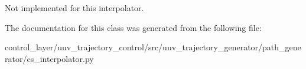 \begin{DoxyVerb}Not implemented for this interpolator.\end{DoxyVerb}
 

The documentation for this class was generated from the following file\+:\begin{DoxyCompactItemize}
\item 
control\+\_\+layer/uuv\+\_\+trajectory\+\_\+control/src/uuv\+\_\+trajectory\+\_\+generator/path\+\_\+generator/cs\+\_\+interpolator.\+py\end{DoxyCompactItemize}
